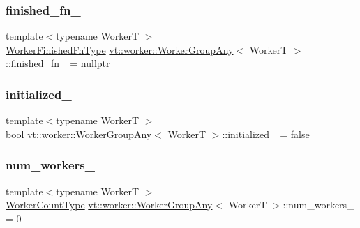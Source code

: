 \subsubsection{\texorpdfstring{finished\+\_\+fn\+\_\+}{finished\_fn\_}}
{\footnotesize\ttfamily template$<$typename WorkerT $>$ \\
\hyperlink{namespacevt_1_1worker_ae32a174a5348d27aafe73c2debea1a94}{Worker\+Finished\+Fn\+Type} \hyperlink{structvt_1_1worker_1_1_worker_group_any}{vt\+::worker\+::\+Worker\+Group\+Any}$<$ WorkerT $>$\+::finished\+\_\+fn\+\_\+ = nullptr\hspace{0.3cm}{\ttfamily [private]}}

\mbox{\label{structvt_1_1worker_1_1_worker_group_any_a3075586e7c554a3d2ca71d657a084b5e}} 
\subsubsection{\texorpdfstring{initialized\+\_\+}{initialized\_}}
{\footnotesize\ttfamily template$<$typename WorkerT $>$ \\
bool \hyperlink{structvt_1_1worker_1_1_worker_group_any}{vt\+::worker\+::\+Worker\+Group\+Any}$<$ WorkerT $>$\+::initialized\+\_\+ = false\hspace{0.3cm}{\ttfamily [private]}}

\mbox{\label{structvt_1_1worker_1_1_worker_group_any_a84a8e36ce6d70e66b712ce04f224fd64}} 
\subsubsection{\texorpdfstring{num\+\_\+workers\+\_\+}{num\_workers\_}}
{\footnotesize\ttfamily template$<$typename WorkerT $>$ \\
\hyperlink{namespacevt_aa93398ea48f2cb6c188512250f7cc248}{Worker\+Count\+Type} \hyperlink{structvt_1_1worker_1_1_worker_group_any}{vt\+::worker\+::\+Worker\+Group\+Any}$<$ WorkerT $>$\+::num\+\_\+workers\+\_\+ = 0\hspace{0.3cm}{\ttfamily [private]}}

